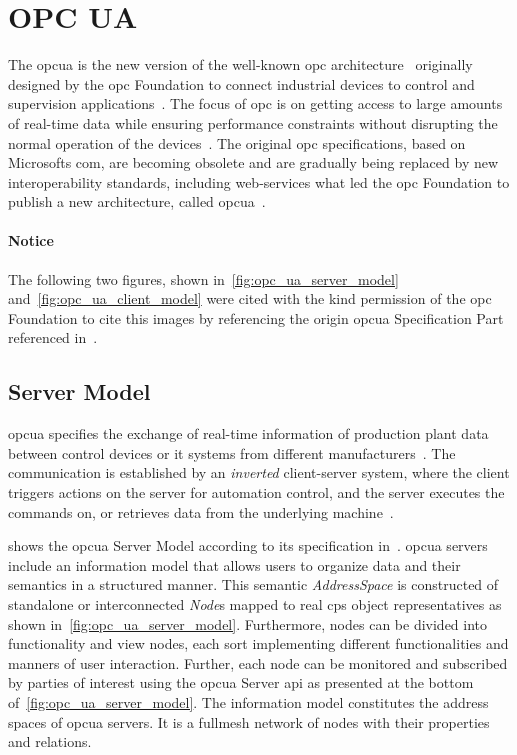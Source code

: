 \documentclass[
a4paper,
twoside,
headsepline,
cleardoublepage=empty,
parskip=half,
draft=false
]{scrbook}
\begin{document}
		\section{OPC UA} \label{sec:opc_ua}

			The \gls{opcua} is the new version of the well-known \gls{opc} architecture~\cite{hadlich2006providing} originally designed by the \gls{opc} Foundation to connect industrial devices to control and supervision applications~\cite{henssen2014online}. 
			The focus of \gls{opc} is on getting access to large amounts of real-time data while ensuring performance constraints without disrupting the normal operation of the devices~\cite{candido2010soa}.
			The original \gls{opc} specifications, based on Microsofts \gls{com}, are becoming obsolete and are gradually being replaced by new interoperability standards, including web-services what led the \gls{opc} Foundation to publish a new architecture, called \gls{opcua}~\cite{hadlich2006providing}.
			
			\paragraph{Notice} The following two figures, shown in~\cref{fig:opc_ua_server_model} and~\cref{fig:opc_ua_client_model} were cited with the kind permission of the \gls{opc} Foundation to cite this images by referencing the origin \gls{opcua} Specification Part referenced in~\cite{opcfoundation2017part1}.

			\subsection{Server Model}\label{subsec:opc_ua_server_model}

				\gls{opcua} specifies the exchange of real-time information of production plant data between control devices or \gls{it} systems from different manufacturers~\cite{venkatesh2005validating}.
				The communication is established by an \textit{inverted} client-server system, where the client triggers actions on the server for automation control, and the server executes the commands on, or retrieves data from the underlying machine~\cite{imtiaz2013scalability}.
				
				 shows the \gls{opcua} Server Model according to its specification in~\cite{opcfoundation2017part1}.
				\gls{opcua} servers include an information model that allows users to organize data and their semantics in a structured manner.
				This semantic \textit{AddressSpace} is constructed of standalone or interconnected \textit{Node}s mapped to real \gls{cps} object representatives as shown in~\cref{fig:opc_ua_server_model}.
				Furthermore, nodes can be divided into functionality and view nodes, each sort implementing different functionalities and manners of user interaction. Further, each node can be monitored and subscribed by parties of interest using the \gls{opcua} Server \gls{api} as presented at the bottom of~\cref{fig:opc_ua_server_model}.
				The information model constitutes the address spaces of \gls{opcua} servers.
				It is a fullmesh network of nodes with their properties and relations.
				
\end{document}

